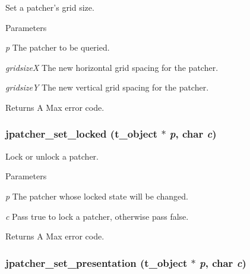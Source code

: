 Set a patcher's grid size. 
\begin{DoxyParams}{Parameters}
\item[{\em p}]The patcher to be queried. \item[{\em gridsizeX}]The new horizontal grid spacing for the patcher. \item[{\em gridsizeY}]The new vertical grid spacing for the patcher. \end{DoxyParams}
\begin{DoxyReturn}{Returns}
A Max error code. 
\end{DoxyReturn}
\hypertarget{group__jpatcher_ga3210a517b3c79b2fb305b9a8357fe3db}{
\subsubsection[{jpatcher\_\-set\_\-locked}]{ jpatcher\_\-set\_\-locked ({\bf t\_\-object} $\ast$ {\em p}, \/  char {\em c})}}
\label{group__jpatcher_ga3210a517b3c79b2fb305b9a8357fe3db}


Lock or unlock a patcher. 
\begin{DoxyParams}{Parameters}
\item[{\em p}]The patcher whose locked state will be changed. \item[{\em c}]Pass true to lock a patcher, otherwise pass false. \end{DoxyParams}
\begin{DoxyReturn}{Returns}
A Max error code. 
\end{DoxyReturn}
\hypertarget{group__jpatcher_ga3994f39cf34c6a1f4502e087ad6adb0a}{
\subsubsection[{jpatcher\_\-set\_\-presentation}]{ jpatcher\_\-set\_\-presentation ({\bf t\_\-object} $\ast$ {\em p}, \/  char {\em c})}}
\label{group__jpatcher_ga3994f39cf34c6a1f4502e087ad6adb0a}


